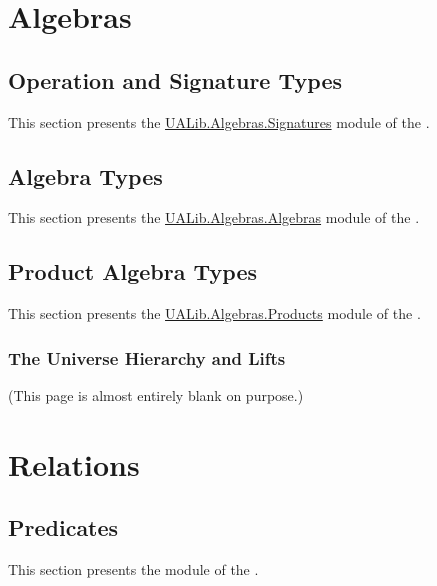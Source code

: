 \documentclass[a4paper,UKenglish,cleveref, autoref, thm-restate]{lipics-v2021}
\begin{document}
\newpage

\section{Algebras}\label{sec:types-for-algebras}

\subsection{Operation and Signature Types}\label{sec:operation-and-signature-types}
This section presents the \href{}{UALib.Algebras.Signatures} module of the \agdaualib.


\subsection{Algebra Types}\label{sec:algebras}
This section presents the \href{}{UALib.Algebras.Algebras} module of the \agdaualib.


\subsection{Product Algebra Types}\label{sec:product-algebra-types}
This section presents the \href{}{UALib.Algebras.Products} module of the \agdaualib.


\subsubsection{The Universe Hierarchy and Lifts}\label{sec:universe-hierarchy-and-lifts}


\newpage

\begin{center}
  (This page is almost entirely blank on purpose.)
\end{center}

\newpage

\section{Relations}\label{sec:relations}

\subsection{Predicates}\label{sec:predicates}
This section presents the \ualibUnary module of the \agdaualib.

\end{document}

